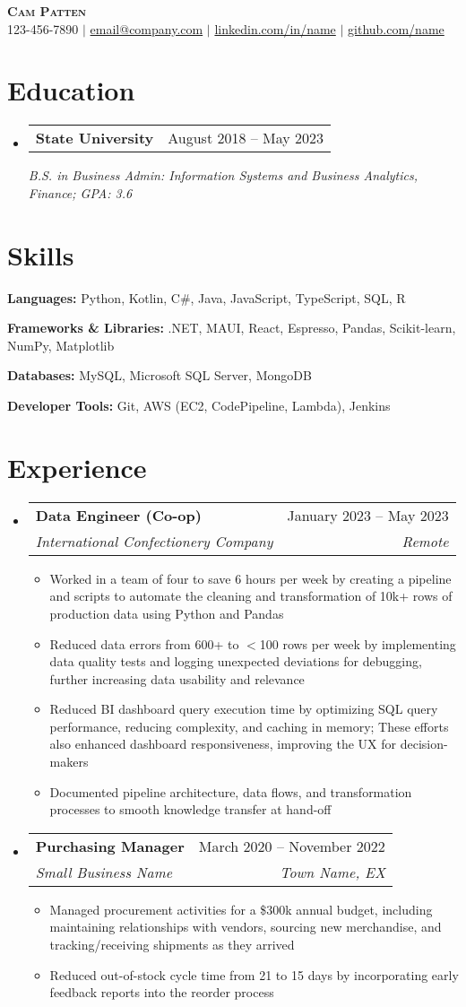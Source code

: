 \documentclass[letterpaper,11pt]{article}
\makeatletter
\newcommand{\bulletpoint}[1]{
  \item\small{
    {#1 \vspace{-2pt}}
  }
}
\newcommand{\heading}[8]{
    \begin{center}
        \textbf{\Huge \scshape #1} \\ \vspace{1pt}
        \small #2 $|$ \href{#3}{#4} $|$  \href{#5}{#6} $|$ \href{#7}{#8}
    \end{center}
}
\newcommand{\education}[3]{
    \vspace{-2pt}\item
    \begin{tabular*}{\textwidth}[t]{l@{\extracolsep{\fill}}r}
        \textbf{#1} & #2 \\
    \end{tabular*}
    \textit{\small#3} \vspace{-7pt}
}
\newcommand{\job}[4]{
    \vspace{-2pt}\item
    \begin{tabular*}{\textwidth}[t]{l@{\extracolsep{\fill}}r}
        \textbf{#1} & #2 \\
        \textit{\small#3} & \textit{\small #4} \\
    \end{tabular*}\vspace{-7pt}
}
\newcommand{\skill}[2]{
    \small{\item{
        \textbf{#1:} #2 \vspace{-9pt}
    }}
}
\newcommand{\educationListStart}{\begin{itemize}[leftmargin=0.00in, label={}]}
\newcommand{\educationListEnd}{\end{itemize}}
\newcommand{\skillliststart}{\begin{itemize}[leftmargin=0.00in, label={}]}
\newcommand{\skilllistend}{\end{itemize}}
\newcommand{\jobliststart}{\begin{itemize}[leftmargin=0.00in, label={}]}
\newcommand{\joblistend}{\end{itemize}}
\newcommand{\bulletpointListStart}{\begin{itemize}}
\newcommand{\bulletpointListEnd}{\end{itemize}\vspace{-5pt}}
\makeatother
\begin{document}
\heading
    {Cam Patten}
    {123-456-7890} 
    {mailto:email@company.com}
    {email@company.com}
    {https://www.linkedin.com/in/name/}
    {linkedin.com/in/name}
    {https://github.com/name}
    {github.com/name}
    
\section{Education}
    \educationListStart
        \education
        {State University}
        {August 2018 -- May 2023}
        {B.S. in Business Admin: Information Systems and Business Analytics, Finance; GPA:  3.6}
    \educationListEnd

\section{Skills}
    \skillliststart
        \skill 
        {Languages}
        {Python, Kotlin, C\#, Java, JavaScript, TypeScript, SQL, R}
        \skill 
        {Frameworks \& Libraries}
        {.NET, MAUI, React, Espresso, Pandas, Scikit-learn, NumPy, Matplotlib}
        \skill 
        {Databases}
        {MySQL, Microsoft SQL Server, MongoDB}
        \skill
        {Developer Tools}
        {Git, AWS (EC2, CodePipeline, Lambda), Jenkins}
    \skilllistend

\section{Experience}
    \jobliststart
        \job
        {Data Engineer (Co-op)}
        {January 2023 -- May 2023}
        {International Confectionery Company}
        {Remote}
        \bulletpointListStart
            \bulletpoint{Worked in a team of four to save 6 hours per week by creating a pipeline and scripts to automate the cleaning and transformation of 10k+ rows of production data using Python and Pandas}
            \bulletpoint{Reduced data errors from 600+ to $<$100 rows per week by implementing data quality tests and logging unexpected deviations for debugging, further increasing data usability and relevance} 
            \bulletpoint{Reduced BI dashboard query execution time by optimizing SQL query performance, reducing complexity, and caching in memory; These efforts also enhanced dashboard responsiveness, improving the UX for decision-makers}
            \bulletpoint{Documented pipeline architecture, data flows, and transformation processes to smooth knowledge transfer at hand-off}
        \bulletpointListEnd
        \job
        {Purchasing Manager}
        {March 2020 -- November 2022}
        {Small Business Name}
        {Town Name, EX}
        \bulletpointListStart
            \bulletpoint{Managed procurement activities for a \$300k annual budget, including maintaining relationships with vendors, sourcing new merchandise, and tracking/receiving shipments as they arrived} 
            \bulletpoint{Reduced out-of-stock cycle time from 21 to 15 days by incorporating early feedback reports into the reorder process} 
        \bulletpointListEnd
    \joblistend
\end{document}
